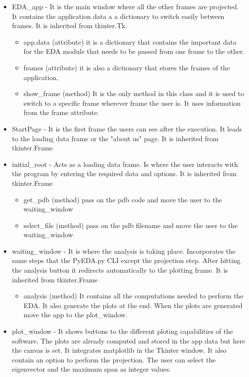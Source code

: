 \documentclass[12pt]{article}
\begin{document}
\begin{itemize}
	\item  EDA\_app - It is the main window where all the other frames are projected. It contains the application data a a dictionary to switch easily between frames. It is inherited from tkinter.Tk. 
	\begin{itemize}
		\item app.data (attribute) it is a dictionary that contains the important data for the EDA module that needs to be passed from one frame to the other. 
		\item frames (attribute) it is also a dictionary that stores the frames of the application. 
		\item show\_frame (method) It is the only method in this class and it is used to switch to a specific frame wherever frame the user is. It uses information from the frame attribute. 
	\end{itemize}
	\item StartPage - It is the first frame the users can see after the execution. It leads to the loading data frame or the "about us" page. It is inherited from tkinter.Frame
	\item initial\_root - Acts as a loading data frame. Is where the user interacts with the program by entering the required data and options. It is inherited from tkinter.Frame
	\begin{itemize}
		\item get\_pdb (method) pass on the pdb code and move the user to the waiting\_window
        \item select\_file (method) pass on the pdb filename and move the user to the waiting\_window
	\end{itemize}
	\item waiting\_window - It is where the analysis is taking place. Incorporates the same steps that the PyEDA.py CLI except the projection step. After hitting the analysis button it redirects automatically to the plotting frame. It is inherited from tkinter.Frame
	\begin{itemize}
		\item analysis (method) It contains all the computations needed to perform the EDA. It also generate the plots at the end. When the plots are generated move the app to the plot\_window.
	\end{itemize}
	\item plot\_window - It shows buttons to the different ploting capabilities of the software. The plots are already computed and stored in the app data but here the canvas is set. It integrates matplotlib in the Tkinter window. It also contain an option to perform the projection. The user can select the eigenvector and the maximum span as integer values.

\end{itemize}
\end{document}
